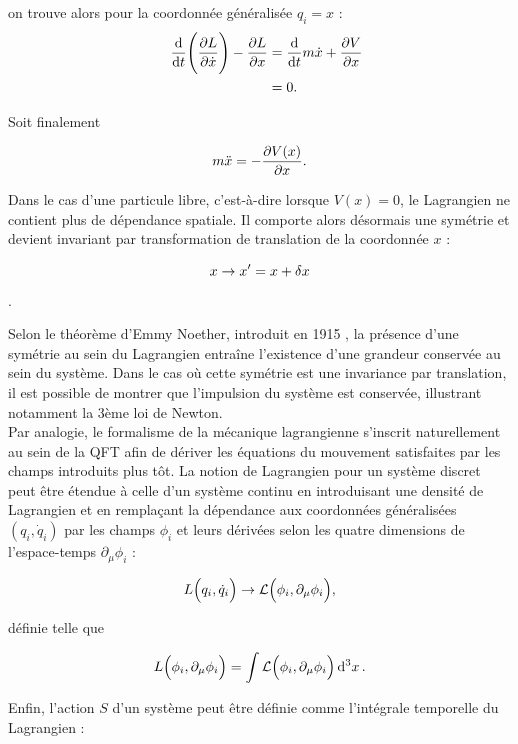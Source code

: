         on trouve alors pour la coordonnée généralisée $q_i=x$ :
        \begin{equation*}
        \begin{split}
            \quad \dv{t}\Biggl(\pdv{L}{\dot x}\Biggr)-\pdv{L}{x} & = \dv{t}m\dot x + \pdv{V}{x} \\
            & = 0.
        \end{split}
        \end{equation*}

        Soit finalement

        \begin{equation}
            m\ddot x = -\pdv{V(x)}{x}.
        \end{equation}

        Dans le cas d'une particule libre, c'est-à-dire lorsque $V(x)=0$, le Lagrangien ne contient plus de dépendance spatiale. Il comporte alors désormais une symétrie et devient invariant par transformation de translation de la coordonnée $x$ :

        $$x\rightarrow x' = x+\var x$$.

        Selon le théorème d'Emmy Noether, introduit en 1915 \cite{Noether1918}, la présence d'une symétrie au sein du Lagrangien entraîne l'existence d'une grandeur conservée au sein du système. Dans le cas où cette symétrie est une invariance par translation, il est possible de montrer que l'impulsion du système est conservée, illustrant notamment la 3ème loi de Newton. \\

        Par analogie, le formalisme de la mécanique lagrangienne s'inscrit naturellement au sein de la QFT afin de dériver les équations du mouvement satisfaites par les champs introduits plus tôt. La notion de Lagrangien pour un système discret peut être étendue à celle d'un système continu en introduisant une densité de Lagrangien et en remplaçant la dépendance aux coordonnées généralisées $(q_i,\dot q_i)$ par les champs $\phi_i$ et leurs dérivées selon les quatre dimensions de l'espace-temps $\partial_{\mu}\phi_i$ :

        $$L\Bigl(q_i,\dot q_i\Bigr)\rightarrow\mathcal{L}\Bigl(\phi_i,\partial_{\mu}\phi_i\Bigr),$$

        définie telle que 
        
        $$L\Bigl(\phi_i,\partial_{\mu}\phi_i\Bigr)=\int\mathcal{L}\Bigl(\phi_i,\partial_{\mu}\phi_i\Bigr)\dd[3]{x}.$$

        Enfin, l'action $S$ d'un système peut être définie comme l'intégrale temporelle du Lagrangien :

